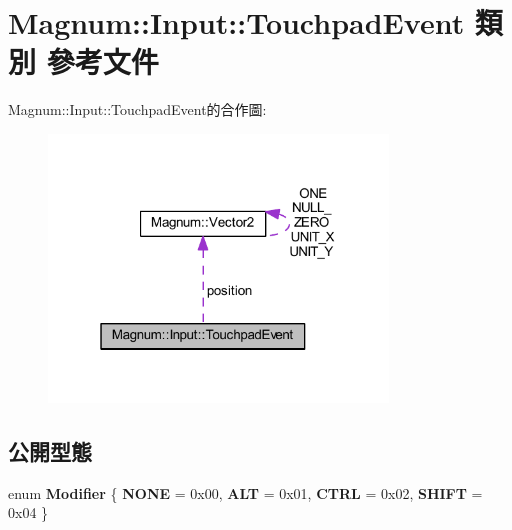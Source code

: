 \hypertarget{class_magnum_1_1_input_1_1_touchpad_event}{}\section{Magnum\+:\+:Input\+:\+:Touchpad\+Event 類別 參考文件}
\label{class_magnum_1_1_input_1_1_touchpad_event}


Magnum\+:\+:Input\+:\+:Touchpad\+Event的合作圖\+:\nopagebreak
\begin{figure}[H]
\begin{center}
\leavevmode
\includegraphics[width=256pt]{class_magnum_1_1_input_1_1_touchpad_event__coll__graph}
\end{center}
\end{figure}
\subsection*{公開型態}
\begin{DoxyCompactItemize}
\item 
enum {\bfseries Modifier} \{ {\bfseries N\+O\+NE} = 0x00, 
{\bfseries A\+LT} = 0x01, 
{\bfseries C\+T\+RL} = 0x02, 
{\bfseries S\+H\+I\+FT} = 0x04
 \}\hypertarget{class_magnum_1_1_input_1_1_touchpad_event_a97c72613c705ffb43e5da2eec11f5cd9}{}\label{class_magnum_1_1_input_1_1_touchpad_event_a97c72613c705ffb43e5da2eec11f5cd9}

\end{DoxyCompactItemize}
